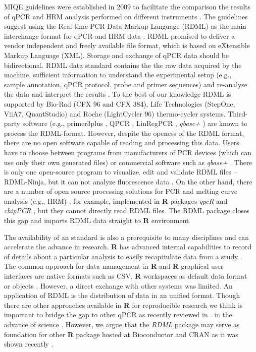\documentclass{bioinfo}
\begin{document}
	MIQE guidelines were established in 2009 to facilitate the comparison the
	results of qPCR and HRM analysis performed on different instruments
	\cite{bustin_miqe_2009, huggett_2013}. The guidelines suggest using the
	Real-time PCR Data Markup Language (RDML) as the main interchange format for
	qPCR and HRM data \cite{rdml-ninja_2015}. RDML promised to deliver a vendor
	independent and freely available file format, which is based on eXtensible
	Markup Language (XML). Storage and exchange of qPCR data should be
	bidirectional. RDML data standard contains the the raw data acquired by the
	machine, sufficient information to understand the experimental setup (e.g.,
	sample annotation, qPCR protocol, probe and primer sequences) and re-analyse the
	data and interpret the results \cite{lefever_rdml:_2009}. To the best of our
	knowledge RDML is supported by Bio-Rad (CFX 96 and CFX 384), Life Technologies
	(StepOne, ViiA7, QuantStudio) and Roche (LightCycler 96) thermo-cycler systems.
	Third-party software (e.g., primer3plus \cite{untergasser_2007}, QPCR
	\cite{pabinger_2009}, LinRegPCR \cite{ruijter_2014}, \textit{qbase+}
	\cite{hellemans_2007}) are known to process the RDML-format. However, despite
	the openess of the RDML format, there are no open software capable of reading
	and processing this data. Users have to choose between programs from
	manufacturers of PCR devices (which can use only their own generated files) or
	commercial software such as \textit{qbase+} \cite{rdml}. There is only one
	open-source program to visualize, edit and validate RDML files -- RDML-Ninja,
	but it can not analyze fluorescence data \cite{rdml-ninja_2015}. On the other
	hand, there are a number of open source processing solutions for PCR and melting
	curve analysis (e.g., HRM) \cite{roediger_RJ_2013,cousins_2012}, for example,
	implemented in \textbf{R} packages \textit{qpcR}\cite{ritz_qpcr:_2008} and
	\textit{chipPCR} \cite{rodiger2015chippcr}, but they cannot directly read RDML
	files. The RDML package closes this gap and imports RDML data straight to
	\textbf{R} environment.
	
	The availability of an standard is also a prerequisite to many disciplines and
	can accelerate the advance in research. \textbf{R} has advanced internal
	capabilities to record of details about a particular analysis to easily
	recapitulate data from a study \cite{liu_2014}. The common approach for data
	management in \textbf{R} and \textbf{R} graphical user interfaces are native
	formats such as CSV, \textbf{R} workspaces as default data format or objects
	\cite{rodiger_rkward_2012, pabinger_2014, RDCT2014c}. However, a direct exchange
	with other systems was limited. An application of RDML is the distribution of
	data in an unified format. Though there are other approaches available in
	\textbf{R} for reproducible research \cite{Leeper_2014} we think is important to
	bridge the gap to other qPCR as recently reviewed in \cite{pabinger_2014}. in
	the advance of science \cite{gentleman_2004}. However, we argue that the
	\textit{RDML} package may serve as foundation for other \textbf{R} package
	hosted at Bioconductor \cite{gentleman_2004} and CRAN \cite{RCT} as it was shown
	recently \cite{rodiger2015r}.
	
\end{document}
